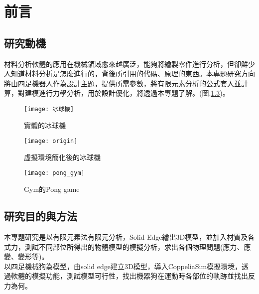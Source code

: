 \chapter{前言}
\renewcommand{\baselinestretch}{10.0} %
\setcounter{page}{1}  %
\fontsize{14pt}{2.5pt}\sectionef
\section{研究動機}
材料分析軟體的應用在機械領域愈來越廣泛，能夠將繪製零件進行分析，但卻鮮少人知道材料分析是怎麼進行的，背後所引用的代碼、原理的東西。本專題研究方向將由四足機器人作為設計主題，提供所需參數，將有限元素分析的公式套入並計算，對建模進行力學分析，用於設計優化，將透過本專題了解。(圖.\ref{fig.pong_gym})。\\

\begin{figure}[hbt!]
\begin{center}
\texttt{[image: 冰球機]}
\caption{\Large 實體的冰球機}\label{fig.冰球機}
\end{center}
\end{figure}

\begin{figure}[hbt!]
\begin{center}
\texttt{[image: origin]}
\caption{\Large 虛擬環境簡化後的冰球機}\label{fig.模擬冰球機}
\end{center}
\end{figure}

\begin{figure}[hbt!]
\begin{center}
\texttt{[image: pong\_gym]}
\caption{\Large Gym的Pong game}\label{fig.pong_gym}
\end{center}
\end{figure}
\section{研究目的與方法}
本專題研究是以有限元素法有限元分析，Solid Edge繪出3D模型，並加入材質及各式力，測試不同部位所得出的物體模型的模擬分析，求出各個物理問題(應力、應變、變形等)。\\

以四足機械狗為模型，由solid edge建立3D模型，導入CoppeliaSim模擬環境，透過軟體的模擬功能，測試模型可行性，找出機器狗在運動時各部位的軌跡並找出反力為何。\\

